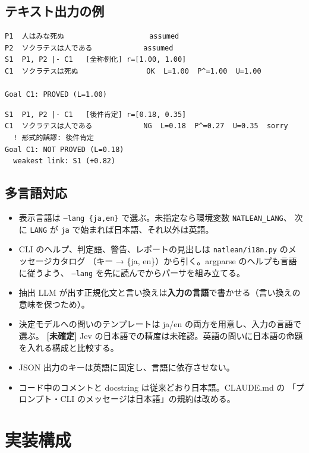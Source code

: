 \documentclass[a4paper,11pt]{ltjsarticle}
\newcommand{\tbd}[1]{\textcolor{red!70!black}{\textbf{[未確定]} #1}}
\begin{document}
\subsection{テキスト出力の例}

\begin{lstlisting}
P1  人はみな死ぬ                    assumed
P2  ソクラテスは人である            assumed
S1  P1, P2 |- C1   [全称例化] r=[1.00, 1.00]
C1  ソクラテスは死ぬ                OK  L=1.00  P^=1.00  U=1.00

Goal C1: PROVED (L=1.00)
\end{lstlisting}

\begin{lstlisting}
S1  P1, P2 |- C1   [後件肯定] r=[0.18, 0.35]
C1  ソクラテスは人である            NG  L=0.18  P^=0.27  U=0.35  sorry
  ! 形式的誤謬: 後件肯定
Goal C1: NOT PROVED (L=0.18)
  weakest link: S1 (+0.82)
\end{lstlisting}

\subsection{多言語対応}

\begin{itemize}
  \item 表示言語は \texttt{--lang \{ja,en\}} で選ぶ。未指定なら環境変数 \texttt{NATLEAN\_LANG}、
        次に \texttt{LANG} が \texttt{ja} で始まれば日本語、それ以外は英語。
  \item CLI のヘルプ、判定語、警告、レポートの見出しは \texttt{natlean/i18n.py} のメッセージカタログ
        （キー → \{ja, en\}）から引く。argparse のヘルプも言語に従うよう、
        \texttt{--lang} を先に読んでからパーサを組み立てる。
  \item 抽出 LLM が出す正規化文と言い換えは\textbf{入力の言語}で書かせる（言い換えの意味を保つため）。
  \item 決定モデルへの問いのテンプレートは ja/en の両方を用意し、入力の言語で選ぶ。
        \tbd{Jev の日本語での精度は未確認。英語の問いに日本語の命題を入れる構成と比較する。}
  \item JSON 出力のキーは英語に固定し、言語に依存させない。
  \item コード中のコメントと docstring は従来どおり日本語。CLAUDE.md の
        「プロンプト・CLI のメッセージは日本語」の規約は改める。
\end{itemize}

\section{実装構成}
\end{document}
